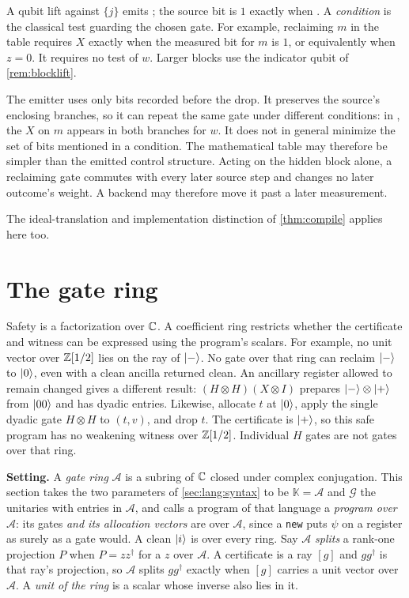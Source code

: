 \documentclass[acmsmall,screen,review,anonymous,nonacm]{acmart}
\begin{document}
A qubit lift against $\{j\}$ emits ; the source
bit is $1$ exactly when . A \emph{condition} is the
classical test guarding the chosen gate. For example, reclaiming $m$ in
the table requires $X$ exactly when the measured bit for $m$ is $1$,
or equivalently when $z=0$. It requires no test of $w$.
Larger blocks use the indicator qubit of \cref{rem:blocklift}.

The emitter uses only bits recorded before the drop. It preserves the
source's enclosing branches, so it can repeat the same gate under
different conditions: in , the $X$ on $m$ appears in
both branches for $w$. It does not in general minimize the set of bits
mentioned in a condition. The mathematical table may therefore be
simpler than the emitted control structure.
Acting on the hidden block alone, a reclaiming gate commutes with every
later source step and changes no later outcome's weight. A backend may
therefore move it past a later measurement.

\stmtCompileLeaf

The ideal-translation and implementation distinction of
\cref{thm:compile} applies here too.

\section{The gate ring}\label{sec:rings}\label{sec:gateset}

Safety is a factorization over $\mathbb{C}$. A coefficient ring restricts whether
the certificate and witness can be expressed using the program's scalars.
For example, no unit vector over $\mathbb{Z}[1/2]$ lies on the ray of $\lvert - \rangle$.
No gate over that ring can reclaim $\lvert - \rangle$ to $\lvert 0 \rangle$, even with a
clean ancilla returned clean. An ancillary register allowed to remain changed gives a different result:
$(H\otimes H)(X\otimes I)$ prepares
$\lvert - \rangle\otimes\lvert + \rangle$ from $\lvert 00 \rangle$ and has dyadic entries.
Likewise, allocate $t$ at $\lvert 0 \rangle$, apply the single dyadic gate
$H\otimes H$ to $(t,v)$, and drop $t$. The certificate is $\lvert + \rangle$,
so this safe program has no weakening witness over $\mathbb{Z}[1/2]$.
Individual $H$ gates are not gates over that ring.

\textbf{Setting.} A \emph{gate ring} $\mathcal A$ is a subring of $\mathbb{C}$ closed
under complex conjugation. This section takes the two parameters of
\cref{sec:lang:syntax} to be $\mathbb K = \mathcal A$ and $\mathcal G$ the
unitaries with entries in $\mathcal A$, and calls a program of that language a
\emph{program over $\mathcal A$}: its gates \emph{and its allocation vectors}
are over $\mathcal A$, since a \texttt{new} puts $\psi$ on a register as surely
as a gate would. A clean $\lvert i \rangle$ is over every ring. Say $\mathcal A$
\emph{splits} a rank-one projection $P$ when $P = zz^{\dagger}$ for a $z$ over
$\mathcal A$. A certificate is a ray $[g]$ and $gg^{\dagger}$ is that ray's
projection, so $\mathcal A$ splits $gg^{\dagger}$ exactly when $[g]$ carries a
unit vector over $\mathcal A$.
A \emph{unit of the ring} is a scalar whose inverse also lies in it.
\end{document}
